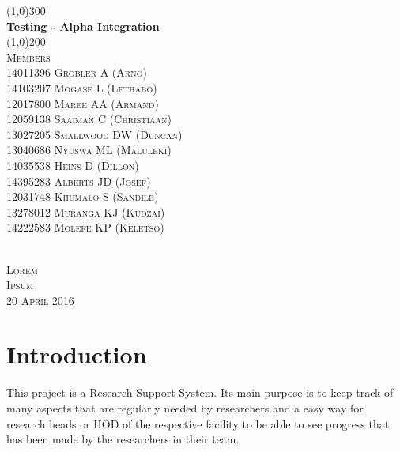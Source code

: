 \documentclass{article}
\begin{document}
\begin{titlepage}
	\begin{center}
		\line(1,0){300}\\
		[6mm]
		\huge{\bfseries Testing - Alpha Integration}\\
		[2mm]
		\line(1,0){200}\\
		[15mm]
		\textsc{\large Members}\\
		[7.5mm]
		\textsc{
                \large14011396	Grobler	A (Arno) \\
                14103207	Mogase	L (Lethabo)\\
                12017800	Maree	AA (Armand)\\
                12059138	Saaiman	C (Christiaan)\\
                13027205	Smallwood	DW (Duncan)\\
                13040686	Nyuswa	ML (Maluleki)\\
                14035538	Heins	D (Dillon)\\
                14395283	Alberts	JD (Josef)\\
                12031748	Khumalo	S (Sandile)\\
                13278012	Muranga	KJ (Kudzai)\\
                14222583	Molefe	KP (Keletso)\\
            }\\
		[8cm]
	\end{center}
	
	\begin{flushright}
		\textsc{\large Lorem\\
		Ipsum\\
		20 April 2016\\}
	\end{flushright}
\end{titlepage}

\tableofcontents
\thispagestyle{empty}
\cleardoublepage
%

\setcounter{page}{1}
%

\section{Introduction}\label{sec:intro}
    This project is a Research Support System. Its main purpose is to keep track of many aspects that are regularly needed by researchers and a easy way for research heads or HOD of the respective facility to be able to see progress that has been made by the researchers in their team.
    
\end{document}
